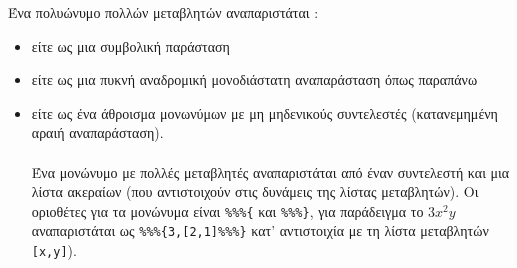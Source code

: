 \documentclass[a4paper,11pt]{book}
\newcommand{\en}{\selectlanguage{english}}
\begin{document}
Ένα πολυώνυμο πολλών μεταβλητών αναπαριστάται :
\begin{itemize}
\item είτε ως μια συμβολική παράσταση
\item είτε ως μια πυκνή αναδρομική μονοδιάστατη αναπαράσταση όπως παραπάνω
\item είτε ως ένα άθροισμα
μονωνύμων με μη μηδενικούς συντελεστές (κατανεμημένη αραιή 
αναπαράσταση).\\ \\
Ένα μονώνυμο με πολλές μεταβλητές αναπαριστάται από έναν συντελεστή και μια λίστα
 ακεραίων (που αντιστοιχούν στις δυνάμεις της λίστας μεταβλητών). Οι οριοθέτες 
για τα μονώνυμα είναι
{\tt \%\%\%\{} και {\tt \%\%\%\}}, για παράδειγμα το $3x^2y$ αναπαριστάται ως 
{\tt \%\%\%\{3,[2,1]\%\%\%\}} κατ' αντιστοιχία με τη λίστα μεταβλητών {\en\tt [x,y]}).
\end{itemize} 
\end{document}
